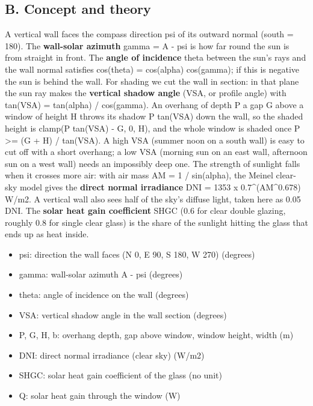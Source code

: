 \documentclass[11pt,a4paper]{article}
\begin{document}
\subsection*{B. Concept and theory}
A vertical wall faces the compass direction psi of its outward normal (south = 180). The \textbf{wall-solar azimuth} gamma = A - psi is how far round the sun is from straight in front. The \textbf{angle of incidence} theta between the sun's rays and the wall normal satisfies cos(theta) = cos(alpha) cos(gamma); if this is negative the sun is behind the wall. For shading we cut the wall in section: in that plane the sun ray makes the \textbf{vertical shadow angle} (VSA, or profile angle) with tan(VSA) = tan(alpha) / cos(gamma). An overhang of depth P a gap G above a window of height H throws its shadow P tan(VSA) down the wall, so the shaded height is clamp(P tan(VSA) - G, 0, H), and the whole window is shaded once P >= (G + H) / tan(VSA). A high VSA (summer noon on a south wall) is easy to cut off with a short overhang; a low VSA (morning sun on an east wall, afternoon sun on a west wall) needs an impossibly deep one. The strength of sunlight falls when it crosses more air: with air mass AM = 1 / sin(alpha), the Meinel clear-sky model gives the \textbf{direct normal irradiance} DNI = 1353 x 0.7\textasciicircum{}(AM\textasciicircum{}0.678) W/m2. A vertical wall also sees half of the sky's diffuse light, taken here as 0.05 DNI. The \textbf{solar heat gain coefficient} SHGC (0.6 for clear double glazing, roughly 0.8 for single clear glass) is the share of the sunlight hitting the glass that ends up as heat inside.

\begin{itemize}[nosep]
\item psi: direction the wall faces (N 0, E 90, S 180, W 270) (degrees)
\item gamma: wall-solar azimuth A - psi (degrees)
\item theta: angle of incidence on the wall (degrees)
\item VSA: vertical shadow angle in the wall section (degrees)
\item P, G, H, b: overhang depth, gap above window, window height, width (m)
\item DNI: direct normal irradiance (clear sky) (W/m2)
\item SHGC: solar heat gain coefficient of the glass (no unit)
\item Q: solar heat gain through the window (W)
\end{itemize}
\end{document}
